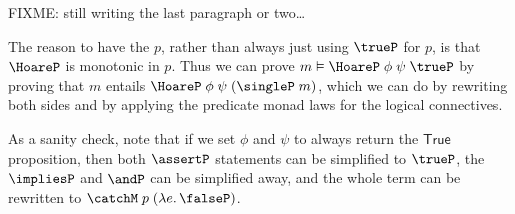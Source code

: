 \documentclass[preprint]{sigplanconf}
\begin{document}
FIXME: still writing the last paragraph or two\ldots

The reason to have the $p$, rather than always just using $\trueP$ for $p$, is
that $\HoareP$ is monotonic in $p$. Thus we can prove
$m\vDash\HoareP\;\phi\;\psi\;\trueP$ by proving that $m$ entails
$\HoareP\;\phi\;\psi\;(\singleP\;m)$, which we can do by rewriting both sides
and by applying the predicate monad laws for the logical connectives.




As a sanity check, note that if we set $\phi$ and $\psi$ to always return the
$\mathsf{True}$ proposition, then both $\assertP$ statements can be simplified
to $\trueP$, the $\impliesP$ and $\andP$ can be simplified away, and the whole
term can be rewritten to $\catchM\;p\;(\lamabsnot{e}{\falseP})$.





\end{document}
